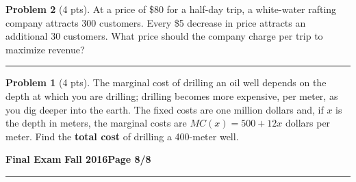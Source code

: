 \documentclass[12pt]{article}
\theoremstyle{definition}
\newtheorem{problem}{Problem}
\begin{document}
\begin{problem}[4 pts]
At a price of \$80 for a half-day trip, a white-water rafting company attracts 300 customers.  Every \$5 decrease in price attracts an additional 30 customers.  What price should the company charge per trip to maximize revenue?
\vspace{7cm}
\hrule

\begin{problem}[4 pts]
The marginal cost of drilling an oil well depends on the depth at which you are drilling; drilling becomes more expensive, per meter, as you dig deeper into the earth.  The fixed costs are one million dollars and, if $x$ is the depth in meters, the marginal costs are $MC(x) = 500 + 12x$ dollars per meter.  Find the \textbf{total cost} of drilling a 400-meter well.
\end{problem}

\end{problem}

\newpage

\hfill{\large\bf Final Exam}\hfill{\large\bf
  Fall 2016}\hfill{\large\bf Page 8/8}\hrule
\end{document}
